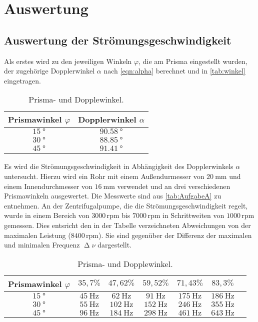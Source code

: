 \section{Auswertung}
\label{sec:Auswertung}

\subsection{Auswertung der Strömungsgeschwindigkeit}
\label{subsec:stroemi}
Als erstes wird zu den jeweiligen Winkeln $\varphi$, die am Prisma eingestellt wurden, der zugehörige Dopplerwinkel $\alpha$ nach \autoref{eqn:alpha}
berechnet und in \autoref{tab:winkel} eingetragen.
\begin{table}[H]
  \centering
  \caption{Prisma- und Dopplewinkel.}
  \label{tab:winkel}
  \begin{tabular}{c c}
    \toprule
    Prismawinkel $\varphi$ & Dopplerwinkel $\alpha$ \\
    \midrule
    $\SI{15}{\degree}$ & $\SI{90,58}{\degree}$ \\
    $\SI{30}{\degree}$ & $\SI{88,85}{\degree}$ \\
    $\SI{45}{\degree}$ & $\SI{91,41}{\degree}$ \\
    \bottomrule
  \end{tabular}
\end{table}

\noindent
Es wird die Strömungsgeschwindigkeit in Abhängigkeit des Dopplerwinkels $\alpha$ untersucht. Hierzu wird ein Rohr mit einem Außendurmesser von $\SI{20}{\milli\meter}$
und einem Innendurchmesser von $\SI{16}{\milli\meter}$ verwendet und an drei verschiedenen Prismawinkeln ausgewertet. Die Messwerte sind aus \autoref{tab:AufgabeA} zu entnehmen.
An der Zentrifugalpumpe, die die Strömungsgeschwindigkeit regelt, wurde in einem Bereich von $3000 \,\text{rpm}$ bis $7000 \,\text{rpm}$ in Schrittweiten von $1000 \,\text{rpm}$ gemessen. Dies entsricht den in der
Tabelle verzeichneten Abweichungen von der maximalen Leistung ($8400\, \text{rpm}$). Sie sind gegenüber der Differenz der maximalen und minimalen Frequenz $\upDelta \nu$ dargestellt.
\begin{table}[H]
  \centering
  \caption{Prisma- und Dopplewinkel.}
  \label{tab:AufgabeA}
  \begin{tabular}{c c c c c c c}
    \toprule
    Prismawinkel $\varphi$ & $35,7 \%$ & $47,62 \%$ & $59,52 \%$ & $71,43 \%$ & $83,3 \%$\\
    \midrule
    $\SI{15}{\degree}$ & $\SI{45}{\hertz}$ & $\SI{62}{\hertz}$ & $\SI{91}{\hertz}$ & $\SI{175}{\hertz}$ & $\SI{186}{\hertz}$ \\
    $\SI{30}{\degree}$ & $\SI{55}{\hertz}$ & $\SI{102}{\hertz}$ & $\SI{152}{\hertz}$ & $\SI{246}{\hertz}$ & $\SI{355}{\hertz}$ \\
    $\SI{45}{\degree}$ & $\SI{96}{\hertz}$ & $\SI{184}{\hertz}$ & $\SI{298}{\hertz}$ & $\SI{461}{\hertz}$ & $\SI{643}{\hertz}$ \\
    \bottomrule
  \end{tabular}
\end{table}

